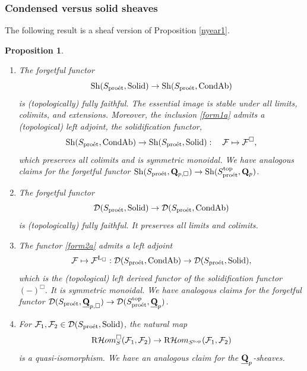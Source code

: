 \documentclass[10pt]{amsart}
\let\cal\mathcal
\newtheorem{proposition}[equation]{Proposition}
\theoremstyle{definition}
\theoremstyle{remark}
\newcommand{\proeet}{\operatorname{pro\acute{e}t} }
\newcommand{\Hhom}{{\cal Hom}}
\newcommand{\LL}{\operatorname{L} }
\newcommand{\sff}{{\mathcal{F}}}
\newcommand{\sd}{{\mathcal{D}}}
\numberwithin{equation}{section}
\def\R{{\mathrm R}}
\def\Q{{\bf Q}} \def\Z{{\bf Z}}
\numberwithin{equation}{section}
\begin{document}
  \subsubsection{Condensed versus solid sheaves}
The following result is a sheaf version of Proposition \ref{nyear1}. 
  \begin{proposition}\label{nyear1a}
  \begin{enumerate}
 \item  The forgetful functor
 \begin{equation}\label{form1a}
 {\rm Sh}(S_{\proeet},{\rm Solid})\to  {\rm Sh}(S_{\proeet},{\rm CondAb})
 \end{equation}
 is  (topologically) fully faithful. The essential image is
  stable under all limits, colimits, and extensions.  Moreover, the
inclusion \eqref{form1a} admits a (topological)  left adjoint, the solidification functor, 
\begin{equation}
 \label{form11a}
{\rm Sh}(S_{\proeet},{\rm CondAb})\to  {\rm Sh}(S_{\proeet},{\rm Solid}): \quad \sff \mapsto \sff^{\Box}, 
 \end{equation}
which   preserves all colimits and is  symmetric monoidal. We have analogous claims for the forgetful functor  ${\rm Sh}(S_{\proeet},\Q_{p,\Box}) \to {\rm Sh}(S^{\rm top}_{\proeet},\Q_p)$.
\item 
  The  forgetful functor
  \begin{equation}\label{form2a}
  \sd(S_{\proeet},{\rm Solid})\to \sd(S_{\proeet},{\rm CondAb})
  \end{equation}
   is  (topologically) fully faithful.   It preserves  all limits and colimits. 
\item The functor \eqref{form2a}  admits a  left adjoint
$$\sff  \mapsto  \sff^{\LL_{\Box}}: \sd(S_{\proeet},{\rm CondAb}) \to \sd(S_{\proeet},{\rm Solid}),
$$
which is the (topological)  left derived functor of the solidification functor $(-)^{\Box}$.   It is symmetric monoidal. We have analogous claims for the forgetful functor $\sd(S_{\proeet},\underline{\Q}_{p,\Box})\to \sd(S^{\rm top}_{\proeet},\underline{\Q}_{p})$.
\item For  $\sff_1, \sff_2 \in \sd(S_{\proeet},{\rm Solid})$, the natural map
$$\R{\Hhom}^{\Box}_{S}(\sff_1,\sff_2) \to  \R{\Hhom}_{S^{\rm top}}(\sff_1,\sff_2)$$
is a quasi-isomorphism. We have an analogous claim for the $\underline{\Q}_p$-sheaves.
\end{enumerate}
  \end{proposition}
\end{document}
